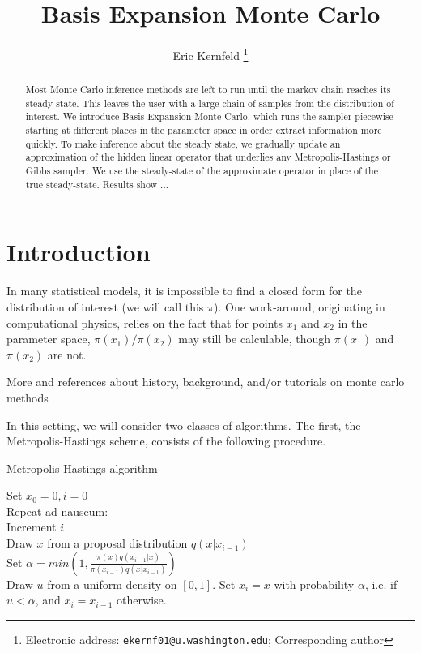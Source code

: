 \documentclass{article}
\begin{document}
\title{Basis Expansion Monte Carlo}

\author{Eric Kernfeld
  \thanks{Electronic address: \texttt{ekernf01@u.washington.edu}; Corresponding author}}
\maketitle

\begin{abstract}
Most Monte Carlo inference methods are left to run until the markov chain reaches its steady-state. This leaves the user with a large chain of samples from the distribution of interest. We introduce Basis Expansion Monte Carlo, which runs the sampler piecewise starting at different places in the parameter space in order extract information more quickly. To make inference about the steady state, we gradually update an approximation of the hidden linear operator that underlies any Metropolis-Hastings or Gibbs sampler. We use the steady-state of the approximate operator in place of the true steady-state. Results show ...
\end{abstract}


\section{Introduction}
In many statistical models, it is impossible to find a closed form for the distribution of interest (we will call this $\pi$). One work-around, originating in computational physics, relies on the fact that for points $x_1$ and $x_2$ in the parameter space, $\pi(x_1)/\pi(x_2)$ may still be calculable, though $\pi(x_1)$ and $\pi(x_2)$ are not.

More and references about history, background, and/or tutorials on monte carlo methods

In this setting, we will consider two classes of algorithms. The first, the Metropolis-Hastings scheme, consists of the following procedure.

\begin{algorithm}[h]
\caption{Metropolis-Hastings algorithm}
Set $x_0 = 0, i=0$\\
Repeat ad nauseum:\\
\Indp
Increment $i$\\
Draw $x$ from a proposal distribution $q(x|x_{i-1})$\\
Set $\alpha = min(1, \frac{\pi(x)q(x_{i-1}|x)}{\pi(x_{i-1})q(x|x_{i-1})})$\\
Draw $u$ from a uniform density on $[0,1]$.
Set $x_i = x$ with probability $\alpha$, i.e. if $u<\alpha$, and $x_i = x_{i-1}$ otherwise.\\
\end{algorithm}
\end{document}
